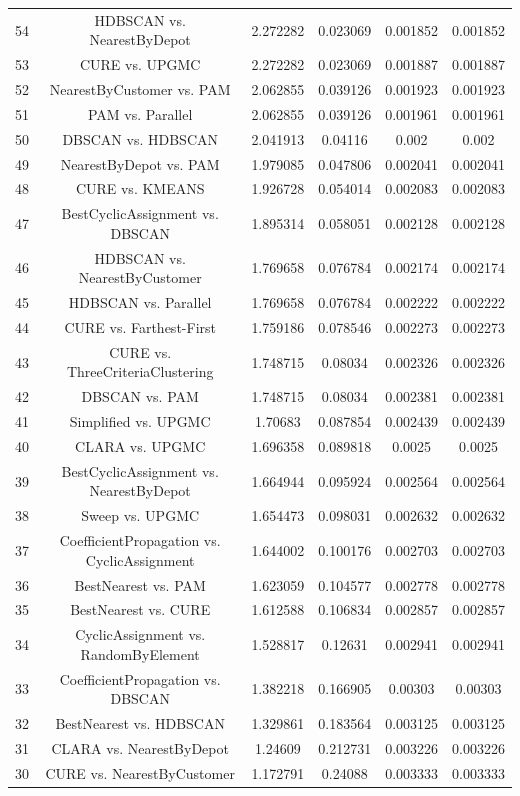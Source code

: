 \documentclass[a4paper,10pt]{article}
\begin{document}
\begin{landscape}
\begin{table}[!htp]
\begin{tabular}{cccccc}
54&HDBSCAN vs. NearestByDepot&2.272282&0.023069&0.001852&0.001852\\
53&CURE vs. UPGMC&2.272282&0.023069&0.001887&0.001887\\
52&NearestByCustomer vs. PAM&2.062855&0.039126&0.001923&0.001923\\
51&PAM vs. Parallel&2.062855&0.039126&0.001961&0.001961\\
50&DBSCAN vs. HDBSCAN&2.041913&0.04116&0.002&0.002\\
49&NearestByDepot vs. PAM&1.979085&0.047806&0.002041&0.002041\\
48&CURE vs. KMEANS&1.926728&0.054014&0.002083&0.002083\\
47&BestCyclicAssignment vs. DBSCAN&1.895314&0.058051&0.002128&0.002128\\
46&HDBSCAN vs. NearestByCustomer&1.769658&0.076784&0.002174&0.002174\\
45&HDBSCAN vs. Parallel&1.769658&0.076784&0.002222&0.002222\\
44&CURE vs. Farthest-First&1.759186&0.078546&0.002273&0.002273\\
43&CURE vs. ThreeCriteriaClustering&1.748715&0.08034&0.002326&0.002326\\
42&DBSCAN vs. PAM&1.748715&0.08034&0.002381&0.002381\\
41&Simplified vs. UPGMC&1.70683&0.087854&0.002439&0.002439\\
40&CLARA vs. UPGMC&1.696358&0.089818&0.0025&0.0025\\
39&BestCyclicAssignment vs. NearestByDepot&1.664944&0.095924&0.002564&0.002564\\
38&Sweep vs. UPGMC&1.654473&0.098031&0.002632&0.002632\\
37&CoefficientPropagation vs. CyclicAssignment&1.644002&0.100176&0.002703&0.002703\\
36&BestNearest vs. PAM&1.623059&0.104577&0.002778&0.002778\\
35&BestNearest vs. CURE&1.612588&0.106834&0.002857&0.002857\\
34&CyclicAssignment vs. RandomByElement&1.528817&0.12631&0.002941&0.002941\\
33&CoefficientPropagation vs. DBSCAN&1.382218&0.166905&0.00303&0.00303\\
32&BestNearest vs. HDBSCAN&1.329861&0.183564&0.003125&0.003125\\
31&CLARA vs. NearestByDepot&1.24609&0.212731&0.003226&0.003226\\
30&CURE vs. NearestByCustomer&1.172791&0.24088&0.003333&0.003333\\

\end{tabular}
\end{table}
\end{landscape}
\end{document}
